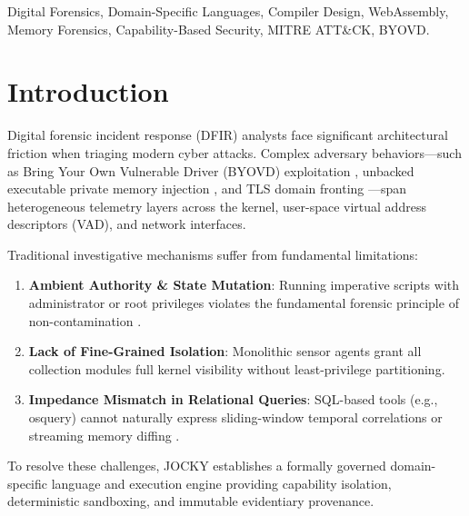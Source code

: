\documentclass[10pt,conference]{IEEEtran}
\begin{document}
\begin{IEEEkeywords}
Digital Forensics, Domain-Specific Languages, Compiler Design, WebAssembly, Memory Forensics, Capability-Based Security, MITRE ATT\&CK, BYOVD.
\end{IEEEkeywords}

\section{Introduction}
Digital forensic incident response (DFIR) analysts face significant architectural friction when triaging modern cyber attacks. Complex adversary behaviors---such as Bring Your Own Vulnerable Driver (BYOVD) exploitation \cite{palix2011coccinelle}, unbacked executable private memory injection \cite{lin2022memory}, and TLS domain fronting \cite{yuan2026mutate}---span heterogeneous telemetry layers across the kernel, user-space virtual address descriptors (VAD), and network interfaces.

Traditional investigative mechanisms suffer from fundamental limitations:
\begin{enumerate}
    \item \textbf{Ambient Authority \& State Mutation}: Running imperative scripts with administrator or root privileges violates the fundamental forensic principle of non-contamination \cite{casey2018case}.
    \item \textbf{Lack of Fine-Grained Isolation}: Monolithic sensor agents grant all collection modules full kernel visibility without least-privilege partitioning.
    \item \textbf{Impedance Mismatch in Relational Queries}: SQL-based tools (e.g., osquery) cannot naturally express sliding-window temporal correlations or streaming memory diffing \cite{vallentin2016vast}.
\end{enumerate}

To resolve these challenges, JOCKY establishes a formally governed domain-specific language and execution engine providing capability isolation, deterministic sandboxing, and immutable evidentiary provenance.
\end{document}
